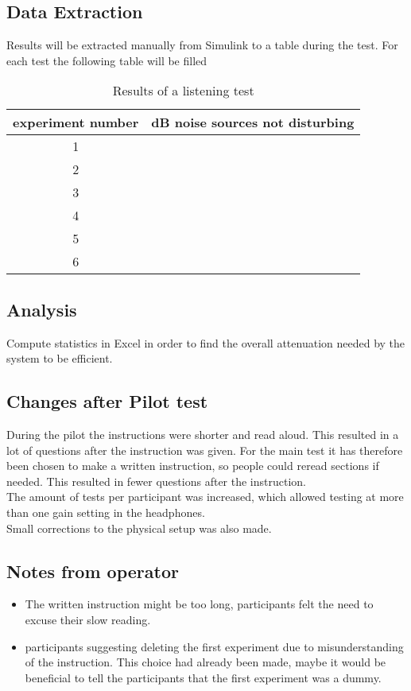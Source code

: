 \subsection{Data Extraction}
Results will be extracted manually from Simulink to a table during the test.
For each test the following table will be filled \\
\begin{table}[H]
\centering
	\begin{tabular}{c  c} \toprule
		experiment number & dB noise sources not disturbing  \\ \bottomrule
		1	&   \\
		2	&	\\
		3	&	\\
		4	&	\\
		5	&	\\
		6	&	\\ \bottomrule
	\end{tabular}
	\caption{Results of a listening test}
	\label{tab:ListeningRes}
\end{table}

\subsection{Analysis}
Compute statistics in Excel in order to find the overall attenuation needed by the system to be efficient.

\subsection{Changes after Pilot test}
During the pilot the instructions were shorter and read aloud. This resulted in a lot of questions after the instruction was given. For the main test it has therefore been chosen to make a written instruction, so people could reread sections if needed. This resulted in fewer questions after the instruction. \\
The amount of tests per participant was increased, which allowed testing at more than one gain setting in the headphones. \\
Small corrections to the physical setup was also made. 

\subsection{Notes from operator}
\begin{itemize}
\item The written instruction might be too long, participants felt the need to excuse their slow reading.
\item participants suggesting deleting the first experiment due to misunderstanding of the instruction. This choice had already been made, maybe it would be beneficial to tell the participants that the first experiment was a dummy. 
\end{itemize}

